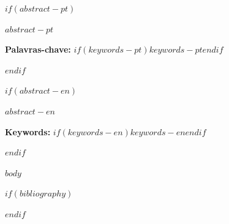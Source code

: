 \documentclass[
  $if(lang)$$lang$$else$brazil$endif$,
  article,
  12pt,
  oneside,
  a4paper
]{abntex2}
\begin{document}
\frenchspacing
\maketitle

$if(abstract-pt)$
\begin{resumoumacoluna}
$abstract-pt$

\vspace{\onelineskip}
\noindent
\textbf{Palavras-chave:} $if(keywords-pt)$$keywords-pt$$endif$
\end{resumoumacoluna}
$endif$

$if(abstract-en)$
\renewcommand{\resumoname}{Abstract}
\begin{resumoumacoluna}
$abstract-en$

\vspace{\onelineskip}
\noindent
\textbf{Keywords:} $if(keywords-en)$$keywords-en$$endif$
\end{resumoumacoluna}
$endif$

\textual
\makeatletter
\let\@afterindentfalse\@afterindenttrue
\makeatother
\setlength{\parindent}{1.3cm}

$body$

\postextual

$if(bibliography)$


$endif$
\end{document}
